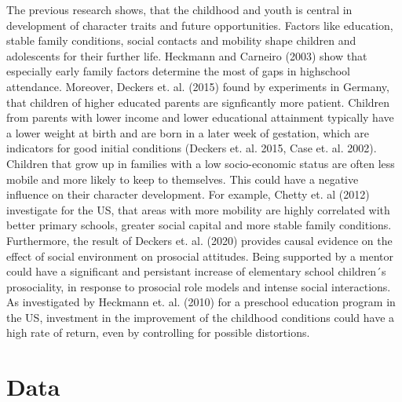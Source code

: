 \documentclass[12pt, a4paper, titlepage]{article}\usepackage[]{graphicx}\usepackage[]{color}
\begin{document}
The previous research shows, that the childhood and youth is central in development of character traits and future opportunities. Factors like education, stable family conditions, social contacts and mobility shape children and adolescents for their further life. Heckmann and Carneiro (2003) show that especially early family factors determine the most of gaps in highschool attendance. Moreover, Deckers et. al. (2015) found by experiments in Germany, that children of higher educated parents are signficantly more patient. Children from parents with lower income and lower educational attainment typically have a lower weight at birth and are born in a later week of gestation, which are indicators for good initial conditions (Deckers et. al. 2015, Case et. al. 2002). Children that grow up in families with a low socio-economic status are often less mobile and more likely to keep to themselves. This could have a negative influence on their character development. For example, Chetty et. al (2012) investigate for the US, that areas with more mobility are highly correlated with better primary schools, greater social capital and more stable family conditions. Furthermore, the result of Deckers et. al. (2020) provides causal evidence on the effect of social environment on prosocial attitudes. Being supported by a mentor could have a significant and persistant increase of elementary school children´s prosociality, in response to prosocial role models and intense social interactions. As investigated by Heckmann et. al. (2010) for a preschool education program in the US, investment in the improvement of the childhood conditions could have a high rate of return, even by controlling for possible distortions.  

\section{Data}
\end{document}

